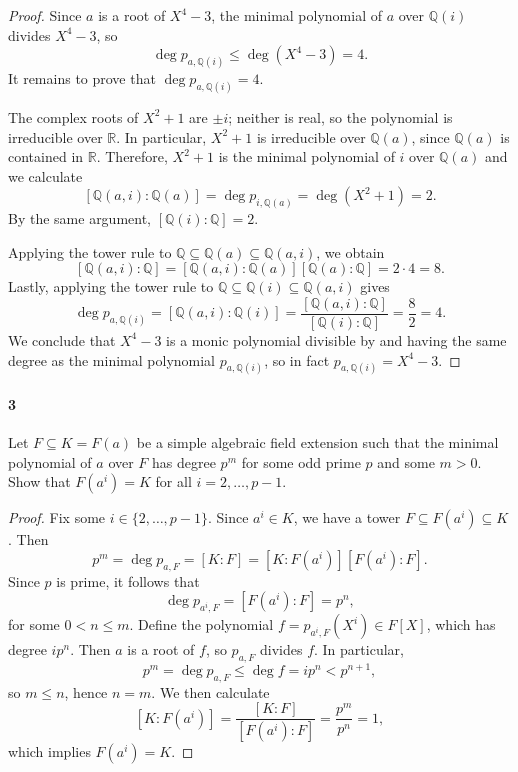 \documentclass[12pt]{article}
\newlength{\myparskip}
\newenvironment{fullbox}{\begin{lrbox}{\savefullbox}\begin{minipage}{\dimexpr\textwidth-2\fboxsep\relax}\setlength{\parskip}{\myparskip}}{\end{minipage}\end{lrbox}\framebox[\textwidth]{\usebox{\savefullbox}}}
\newenvironment{pbox}[1][]{\begin{fullbox}\def\temp{#1}\ifx\temp\empty\else\paragraph{#1}\phantom{}\fi}{\end{fullbox}}
\theoremstyle{definition}
\newcommand{\Q}{\mathbb{Q}}
\newcommand{\R}{\mathbb{R}}
\newcommand{\<}{\langle}
\renewcommand{\>}{\rangle}
\newcommand{\seq}{\subseteq}
\begin{document}
\begin{proof}
    Since $a$ is a root of $X^4 - 3$, the minimal polynomial of $a$ over $\Q(i)$ divides $X^4 - 3$, so
    \[
        \deg p_{a, \Q(i)} \leq \deg(X^4 - 3) = 4.
    \]
    It remains to prove that $\deg p_{a, \Q(i)} = 4$.

    The complex roots of $X^2 + 1$ are $\pm i$; neither is real, so the polynomial is irreducible over $\R$.
    In particular, $X^2 + 1$ is irreducible over $\Q(a)$, since $\Q(a)$ is contained in $\R$.
    Therefore, $X^2 + 1$ is the minimal polynomial of $i$ over $\Q(a)$ and we calculate
    \[
        [\Q(a, i) : \Q(a)]
            = \deg p_{i, \Q(a)}
            = \deg(X^2 + 1)
            = 2.
    \]
    By the same argument, $[\Q(i) : \Q] = 2$.

    Applying the tower rule to $\Q \seq \Q(a) \seq \Q(a, i)$, we obtain
    \[
        [\Q(a, i) : \Q]
            = [\Q(a, i) : \Q(a)][\Q(a) : \Q]
            = 2 \cdot 4
            = 8.
    \]
    Lastly, applying the tower rule to $\Q \seq \Q(i) \seq \Q(a, i)$ gives
    \[
        \deg p_{a, \Q(i)}
            = [\Q(a, i) : \Q(i)]
            = \frac{[\Q(a, i) : \Q]}{[\Q(i) : \Q]}
            = \frac{8}{2}
            = 4.
    \]
    We conclude that $X^4 - 3$ is a monic polynomial divisible by and having the same degree as the minimal polynomial $p_{a, \Q(i)}$, so in fact $p_{a, \Q(i)} = X^4 - 3$.
\end{proof}



\newpage
\begin{pbox}[3]
    Let $F \seq K = F(a)$ be a simple algebraic field extension such that the minimal polynomial of $a$ over $F$ has degree $p^m$ for some odd prime $p$ and some $m > 0$.
    Show that $F(a^i) = K$ for all $i = 2, \dots, p - 1$.
\end{pbox}

\begin{proof}
    Fix some $i \in \{2, \dots, p-1\}$.
    Since $a^i \in K$, we have a tower $F \seq F(a^i) \seq K$.
    Then
    \[
        p^m
            = \deg p_{a, F}
            = [K : F]
            = [K : F(a^i)][F(a^i) : F].
    \]
    Since $p$ is prime, it follows that
    \[
        \deg p_{a^i, F} = [F(a^i) : F] = p^n,
    \]
    for some $0 < n \leq m$.
    Define the polynomial $f = p_{a^i, F}(X^i) \in F[X]$, which has degree $ip^n$.
    Then $a$ is a root of $f$, so $p_{a, F}$ divides $f$.
    In particular,
    \[
        p^m = \deg p_{a, F} \leq \deg f = ip^n < p^{n + 1},
    \]
    so $m \leq n$, hence $n = m$.
    We then calculate
    \[
        [K : F(a^i)]
            = \frac{[K : F]}{[F(a^i) : F]}
            = \frac{p^m}{p^n}
            = 1,
    \]
    which implies $F(a^i) = K$.

\end{proof}
\end{document}
